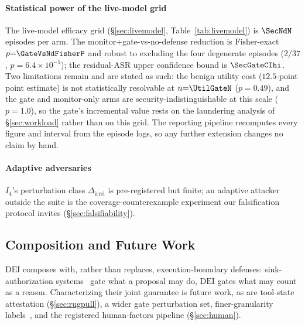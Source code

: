\documentclass[conference]{IEEEtran}
\newcommand{\Ifour}{\ensuremath{I_4}}
\newcommand{\Dirrel}{\ensuremath{\Delta_{\mathrm{irrel}}}}
\newcommand{\DEI}{\ensuremath{\mathrm{DEI}}}
\begin{document}
\paragraph*{Statistical power of the live-model grid}
The live-model efficacy grid (\S\ref{sec:livemodel},
Table~\ref{tab:livemodel}) is $\SecNdN$ episodes per arm. The
monitor+gate-vs-no-defense reduction is Fisher-exact
$p{=}\GateVsNdFisherP$ and robust to excluding the four degenerate
episodes ($2/37$, $p{=}6.4\times10^{-5}$); the residual-ASR upper
confidence bound is $\SecGateCIhi$. Two limitations remain and are
stated as such: the benign utility cost ($12.5$-point point
estimate) is not statistically resolvable at $n{=}\UtilGateN$
($p{=}0.49$), and the gate and monitor-only arms are
security-indistinguishable at this scale ($p{=}1.0$), so the gate's
incremental value rests on the laundering analysis of
\S\ref{sec:workload} rather than on this grid. The reporting
pipeline recomputes every figure and interval from the episode
logs, so any further extension changes no claim by hand.
\paragraph*{Adaptive adversaries}
\Ifour's perturbation class $\Dirrel$ is pre-registered but finite;
an adaptive attacker outside the suite is the
coverage-counterexample experiment our falsification protocol
invites (\S\ref{sec:falsifiability}).

\subsection{Composition and Future Work}
\DEI{} composes with, rather than replaces, execution-boundary
defenses: sink-authorization systems~\cite{cxi,camel} gate what a
proposal may do, \DEI{} gates what may count as a reason.
Characterizing their joint guarantee is future work, as are
tool-state attestation (\S\ref{sec:rugpull}), a wider gate
perturbation set, finer-granularity labels~\cite{argus}, and the
registered human-factors pipeline (\S\ref{sec:human}).
\end{document}
